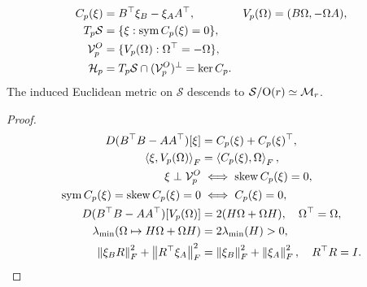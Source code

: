 \begin{lemma}
\label{lem:balanced-horizontal}
\begin{align}
C_p(\xi)&=B^\top\xi_B-\xi_AA^\top,&
V_p(\Omega)&=(B\Omega,-\Omega A),\\
T_p\mathcal S&=\{\xi:\operatorname{sym} C_p(\xi)=0\},\\
\mathcal V_p^O&=\{V_p(\Omega):\Omega^\top=-\Omega\},\\
\mathcal H_p&=T_p\mathcal S\cap(\mathcal V_p^O)^\perp=\ker C_p.
\label{eq:rigid-horizontal}
\end{align}
The induced Euclidean metric on $\mathcal S$ descends to
$\mathcal S/{\rm O}(r)\simeq\mathcal M_r$.
\end{lemma}
\begin{proof}
\begin{align}
D(B^\top B-AA^\top)[\xi]&=C_p(\xi)+C_p(\xi)^\top,\\
\left\langle\xi,V_p(\Omega)\right\rangle_F&=\left\langle C_p(\xi),\Omega\right\rangle_F,\\
\xi\perp\mathcal V_p^O&\iff\operatorname{skew} C_p(\xi)=0,\\
\operatorname{sym} C_p(\xi)=\operatorname{skew} C_p(\xi)=0&\iff C_p(\xi)=0,\\
D(B^\top B-AA^\top)[V_p(\Omega)]
&=2(H\Omega+\Omega H),\quad\Omega^\top=\Omega,\\
\lambda_{\min}(\Omega\mapsto H\Omega+\Omega H)
&=2\lambda_{\min}(H)>0,\\
\left\lVert\xi_BR\right\rVert_F^2+\left\lVert R^\top\xi_A\right\rVert_F^2
&=\left\lVert\xi_B\right\rVert_F^2+\left\lVert\xi_A\right\rVert_F^2,\quad R^\top R=I.
\end{align}
\end{proof}

